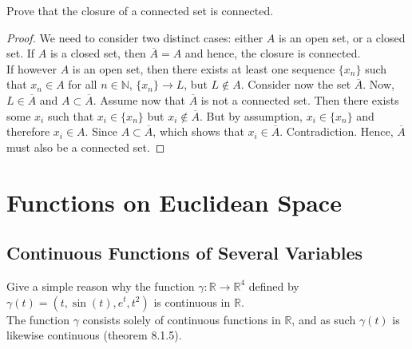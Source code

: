 \documentclass[12pt]{book}
\newcommand{\N}{\mathbb{N}}
\newcommand{\R}{\mathbb{R}}
\newenvironment{exercise}[2][Exercise]{\begin{trivlist}
\item[\hskip \labelsep {\bfseries #1}\hskip \labelsep {\bfseries #2.}]}{\end{trivlist}}
\begin{document}
\begin{exercise}{7.5.10}
Prove that the closure of a connected set is connected.

\begin{proof}
We need to consider two distinct cases: either $A$ is an open set, or a closed set. If $A$ is a closed set, then $\overline{A} = A$ and hence, the closure is connected. \\
If however $A$ is an open set, then there exists at least one sequence $\{x_n\}$ such that $x_n \in A$ for all $n \in \N$, $\{x_n \} \to L$, but $L \notin A$. Consider now the set $\overline{A}$. Now, $L \in \overline{A}$ and $A \subset \overline{A}$. Assume now that $\overline{A}$ is not a connected set. Then there exists some $x_i$ such that $x_i \in \{x_n\}$ but $x_i \notin \overline{A}$. But by assumption, $x_i \in \{x_n\}$ and therefore $x_i \in A$. Since $A \subset \overline{A}$, which shows that $x_i \in \overline{A}$. Contradiction. Hence, $\overline{A}$ must also be a connected set.
\end{proof}
\end{exercise}





\chapter{Functions on Euclidean Space}
\section{Continuous Functions of Several Variables}


\begin{exercise}{8.1.2}
Give a simple reason why the function $\gamma : \R \to \R^4 $ defined by $\gamma (t) = \left( t, \sin(t), e^t, t^2 \right) $ is continuous in $\R$. \\

The function $\gamma$ consists solely of continuous functions in $\R$, and as such $\gamma(t)$ is likewise continuous (theorem 8.1.5).
\end{exercise}
\end{document}
